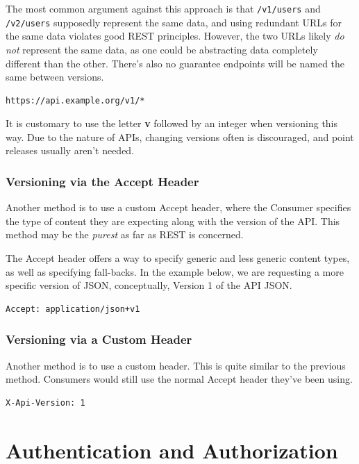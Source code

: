 \documentclass{book}
\begin{document}
The most common argument against this approach is that \texttt{/v1/users} and \texttt{/v2/users} supposedly represent the same data, and using redundant URLs for the same data violates good REST principles. However, the two URLs likely \emph{do not} represent the same data, as one could be abstracting data completely different than the other. There's also no guarantee endpoints will be named the same between versions.

\begin{verbatim}
https://api.example.org/v1/*
\end{verbatim}

It is customary to use the letter \textbf{v} followed by an integer when versioning this way. Due to the nature of APIs, changing versions often is discouraged, and point releases usually aren't needed.

\subsubsection{Versioning via the Accept Header}

Another method is to use a custom Accept header, where the Consumer specifies the type of content they are expecting along with the version of the API. This method may be the \emph{purest} as far as REST is concerned.

The Accept header offers a way to specify generic and less generic content types, as well as specifying fall-backs. In the example below, we are requesting a more specific version of JSON, conceptually, Version 1 of the API JSON.

\begin{verbatim}
Accept: application/json+v1
\end{verbatim}

\subsubsection{Versioning via a Custom Header}

Another method is to use a custom header. This is quite similar to the previous method. Consumers would still use the normal Accept header they've been using.

\begin{verbatim}
X-Api-Version: 1
\end{verbatim}

\section{Authentication and Authorization}
\end{document}
